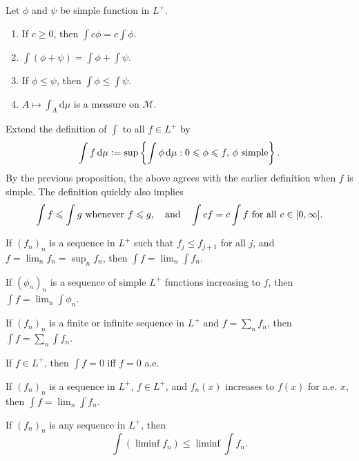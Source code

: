 \documentclass[12pt]{article}	%
\begin{document}
\begin{prop}
	Let $\phi$ and $\psi$ be simple function in $L^{+}$.
	\begin{enumerate}
		\item If $c \ge 0$, then $\int c \phi = c \int \phi$.
		\item $\int(\phi + \psi) = \int \phi + \int \psi$.
		\item If $\phi \le \psi$, then $\int \phi \le \int \psi$.
		\item $A \mapsto \int_{A} {\mathrm d}\mu$ is a measure on $\mathcal{M}$.
	\end{enumerate}
\end{prop}

Extend the definition of $\int$ to all $f \in L^{+}$ by
\begin{equation*} 
	\int f \,{\mathrm d}\mu \vcentcolon= \sup \left\{\int \phi \,{\mathrm d}\mu : 0 \le \phi \le f,\, \phi \text{ simple}\right\}.
\end{equation*}
By the previous proposition, the above agrees with the earlier definition when $f$ is simple. The definition quickly also implies
\begin{equation*} 
	\int f \le \int g \text{ whenever } f \le g, \andd \int cf = c \int f \text{ for all } c \in [0, \infty].
\end{equation*}

\begin{thm}
	If $(f_{n})_{n}$ is a sequence in $L^{+}$ such that $f_{j} \le f_{j + 1}$ for all $j$, and $f = \lim_{n} f_{n} = \sup_{n} f_{n}$, then $\int f = \lim_{n} \int f_{n}$.
\end{thm}
\begin{cor}
	If $(\phi_{n})_{n}$ is a sequence of simple $L^{+}$ functions increasing to $f$, then $\int f = \lim_{n} \int \phi_{n}$.

	If $(f_{n})_{n}$ is a finite or infinite sequence in $L^{+}$ and $f = \sum_{n} f_{n}$, then $\int f = \sum_{n} \int f_{n}$.
\end{cor}

\begin{prop}
	If $f \in L^{+}$, then $\int f = 0$ iff $f = 0$ a.e.

	If $(f_{n})_{n}$ is a sequence in $L^{+}$, $f \in L^{+}$, and $f_{n}(x)$ increases to $f(x)$ for a.e. $x$, then $\int f = \lim_{n} \int f_{n}$.
\end{prop}

\begin{thm}
	If $(f_{n})_{n}$ is any sequence in $L^{+}$, then
	\begin{equation*} 
		\int (\liminf f_{n}) \le \liminf \int f_{n}.
	\end{equation*}
\end{thm}
\end{document}
